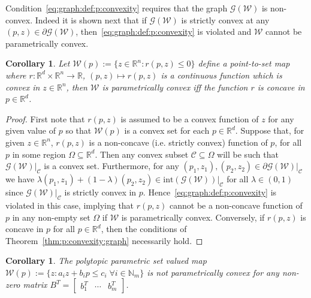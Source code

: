 \documentclass[journal]{IEEEtran}
\newcounter{thmcount}
\newtheorem{cor}[thmcount]{Corollary}
\theoremstyle{remark}
\theoremstyle{definition}
\begin{document}
Condition~\eqref{eq:graph:def:p:convexity} requires that the graph $\mathscr G(\mathcal W)$ is non-convex.
%
Indeed it is shown next that if $\mathscr G(\mathcal W)$ is strictly convex at any $(p,z)\in\partial \mathscr G (\mathcal W)$, then~\eqref{eq:graph:def:p:convexity} is violated and 
$\mathcal W$ cannot be parametrically convex.

%
\begin{cor}
%
Let $\mathcal W(p):=\{z\in\mathbb R^n: r(p,z)\leq0\}$ define a point-to-set
map where 
$r: \mathbb R^d \times\mathbb R^n \rightarrow \mathbb R$, $(p,z)\mapsto r(p,z)$ is a continuous function which is convex in $z \in\mathbb R^n$, 
then $\mathcal W$ is parametrically
convex iff the function $r$ is concave in $p\in\mathbb R^d$.
%
\end{cor}
%
\begin{proof}
First note that $r(p,z)$ is assumed to be a convex function of $z$ for any given value of $p$ so that $\mathcal W(p)$ is a convex set for each $p\in\mathbb R^d$.
%
Suppose that, for given $z\in\mathbb R^n$, $r(p,z)$ is a non-concave (i.e. 
strictly convex) function of $p$, for all $p$ in some region $\Omega\subseteq\mathbb R^d$. 
%
Then any convex subset $\mathcal C\subseteq\Omega$ will be such that $\mathscr 
G(\mathcal W)\vert_{\mathcal C}$ is a convex set.
%
Furthermore, for any $(p_1,z_1),(p_2,z_2)\in \partial\mathscr G(\mathcal W)\vert_{\mathcal C}$ we have
$\lambda (p_1,z_1) + (1-\lambda) (p_2,z_2) \in\mathrm{int} (\mathscr G(\mathcal W))\vert_{\mathcal C}$ for all $\lambda\in(0,1)$ since
$\mathscr G(\mathcal W)\vert_{\mathcal C}$ is strictly convex in $p$.
%
Hence~\eqref{eq:graph:def:p:convexity} is violated in this case, implying that $r(p,z)$ cannot be a non-concave function of $p$ in any non-empty set $\Omega$ if $\mathcal W$ is parametrically convex. 
%
Conversely, if $r(p,z)$ is concave in $p$ for all $p\in\mathbb R^d$, then the conditions of Theorem~\ref{thm:p:convexity:graph} necessarily hold.
\end{proof}
%
\begin{cor}\label{thm:polytopic:set:not:p:convex}
The polytopic parametric set valued map $\mathcal W(p):=\{z: a_i z + b_i p\leq c_i \; \forall i\in\mathbb N_m\}$
is not parametrically convex for 
any non-zero matrix $B^T = [\begin{matrix} b_1^T & \cdots & b_m^T\end{matrix}]$.
\end{cor}
\end{document}

